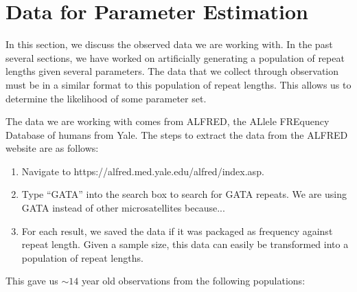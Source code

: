 \section{Data for Parameter Estimation}\label{sec:dfpe}
In this section, we discuss the observed data we are working with.
In the past several sections, we have worked on artificially generating a population of repeat lengths given several
parameters.
The data that we collect through observation must be in a similar format to this population of repeat lengths.
This allows us to determine the likelihood of some parameter set.

The data we are working with comes from ALFRED, the ALlele FREquency Database of humans from Yale.
The steps to extract the data from the ALFRED website are as follows:
\begin{enumerate}
    \item Navigate to https://alfred.med.yale.edu/alfred/index.asp.
    \item Type ``GATA'' into the search box to search for GATA repeats.
        We are using GATA instead of other microsatellites because... %
    \item For each result, we saved the data if it was packaged as frequency against repeat length.
        Given a sample size, this data can easily be transformed into a population of repeat lengths.
\end{enumerate}
This gave us $\sim 14$ year old observations from the following populations:

